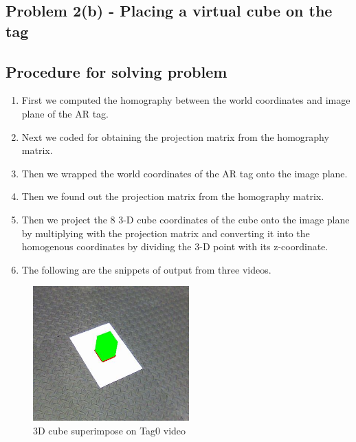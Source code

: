 \documentclass[12pt]{article}
\begin{document}
\subsection{Problem 2(b) - Placing a virtual cube on the tag}
\subsection{Procedure for solving problem }
\begin{enumerate}
\item First we computed the homography between the world coordinates and image plane of the AR tag.

\item Next we coded for obtaining the projection matrix from the homography matrix.

\item Then we wrapped the world coordinates of the AR tag onto the image plane. 

\item Then we found out the projection matrix from the homography matrix.

\item Then we project the 8 3-D cube coordinates of the cube onto the image plane by multiplying with the projection matrix and converting it into the homogenous coordinates by dividing the 3-D point with its z-coordinate.

\item The following are the snippets of output from three videos.
\end{enumerate}
\begin{figure}[h]
    \centering
    \includegraphics[width=6cm]{Tag0_cube}
    \caption{3D cube superimpose on Tag0 video}
    \label{fig:video frame output}
\end{figure}
\end{document}
